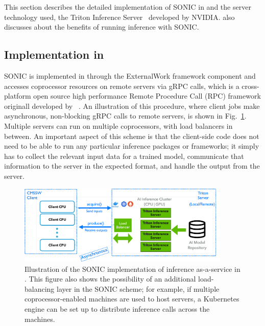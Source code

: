 This section describes the detailed implementation of SONIC in \CMSSW and the server technology used, the Triton Inference Server~\cite{triton} developed by NVIDIA. also discusses about the benefits of running inference with SONIC.

\subsection{Implementation in \CMSSW}

SONIC is implemented in \CMSSW through the ExternalWork framework component and accesses coprocessor resources on remote servers via gRPC calls, which is a cross-platform open source high performance Remote Procedure Call (RPC) framework originall developed by \Google~\cite{gRPC}. An illustration of this procedure, where client jobs make asynchronous, non-blocking gRPC calls to remote servers, is shown in Fig.~\ref{fig:architecture}. Multiple servers can run on multiple coprocessors, with load balancers in between. An important aspect of this scheme is that the client-side code does not need to be able to run any particular inference packages or frameworks; it simply has to collect the relevant input data for a trained model, communicate that information to the server in the expected format, and handle the output from the server.

\begin{figure}[htp]
    \centering
    \includegraphics[width=0.90\textwidth]{plots/architecture.pdf}
    \caption{Illustration of the SONIC implementation of inference as-a-service in \CMSSW. This figure also shows the possibility of an additional load-balancing layer in the SONIC scheme; for example, if multiple coprocessor-enabled machines are used to host servers, a Kubernetes engine can be set up to distribute inference calls across the machines.}
    \label{fig:architecture}
\end{figure}

